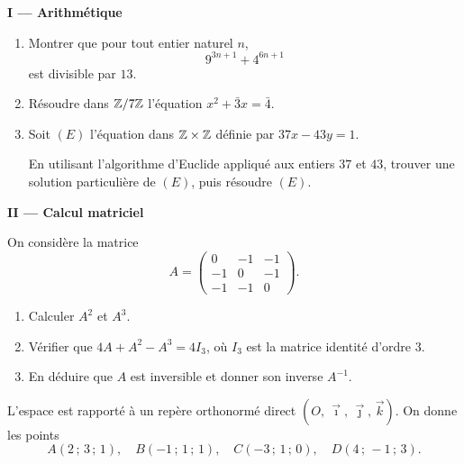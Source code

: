 




\noindent\textbf{I — Arithmétique}

\begin{enumerate}
	\item Montrer que pour tout entier naturel $n$,
	$$
	9^{3n+1} + 4^{6n+1}
	$$
	est divisible par $13$.

	\item Résoudre dans $\mathbb{Z}/7\mathbb{Z}$ l'équation $x^2 + \bar{3}x = \bar{4}$.

	\item Soit $(E)$ l'équation dans $\mathbb{Z} \times \mathbb{Z}$ définie par $37x - 43y = 1$.

	En utilisant l'algorithme d'Euclide appliqué aux entiers $37$ et $43$,
	trouver une solution particulière de $(E)$, puis résoudre $(E)$.
\end{enumerate}

\bigskip

\noindent\textbf{II — Calcul matriciel}

On considère la matrice
$$
A =
\begin{pmatrix}
	0  & -1 & -1 \\
	-1 &  0 & -1 \\
	-1 & -1 &  0
\end{pmatrix}.
$$

\begin{enumerate}
	\item Calculer $A^2$ et $A^3$.
	\item Vérifier que $4A + A^2 - A^3 = 4I_3$, où $I_3$ est la matrice identité d'ordre $3$.
	\item En déduire que $A$ est inversible et donner son inverse $A^{-1}$.
\end{enumerate}




L'espace est rapporté à un repère orthonormé direct $(O,\,\vec{\imath},\,\vec{\jmath},\,\vec{k})$.
On donne les points
$$
A(2\,;\,3\,;\,1),\quad B(-1\,;\,1\,;\,1),\quad C(-3\,;\,1\,;\,0),\quad D(4\,;\,-1\,;\,3).
$$

